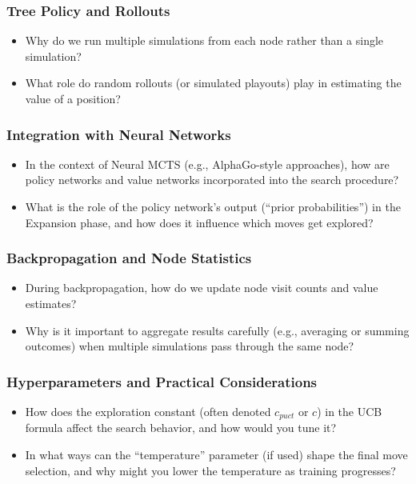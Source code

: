 \subsubsection{Tree Policy and Rollouts}
\begin{itemize} 
   \item Why do we run multiple simulations from each node rather than a single simulation?  
   \item What role do random rollouts (or simulated playouts) play in estimating the value of a position?
\end{itemize}


\subsubsection{Integration with Neural Networks}
\begin{itemize}
    \item In the context of Neural MCTS (e.g., AlphaGo-style approaches), how are policy networks and value networks incorporated into the search procedure?  
    \item What is the role of the policy network’s output (“prior probabilities”) in the Expansion phase, and how does it influence which moves get explored?
\end{itemize}


\subsubsection{Backpropagation and Node Statistics}
\begin{itemize}
    \item During backpropagation, how do we update node visit counts and value estimates?  
    \item Why is it important to aggregate results carefully (e.g., averaging or summing outcomes) when multiple simulations pass through the same node?
\end{itemize}


\subsubsection{Hyperparameters and Practical Considerations}
\begin{itemize}
    \item How does the exploration constant (often denoted \( c_{puct} \) or \( c \)) in the UCB formula affect the search behavior, and how would you tune it?  
    \item In what ways can the “temperature” parameter (if used) shape the final move selection, and why might you lower the temperature as training progresses?
\end{itemize}


